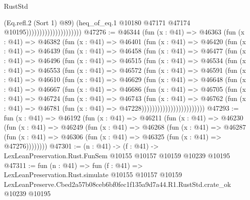 \begin{lexlean}{RustStd}
\begin{coremodule}
                                            (Eq.refl.{2} (Sort 1) @89)
                                            (heq_of_eq.{1}
                                              @10180
                                              @47171
                                              @47174
                                              @10195)))))))))))))))))))))
@47276 := @46344
    (fun (x : @41) =>
    @46363
      (fun (x : @41) =>
      @46382
        (fun (x : @41) =>
        @46401
          (fun (x : @41) =>
          @46420
            (fun (x : @41) =>
            @46439
              (fun (x : @41) =>
              @46458
                (fun (x : @41) =>
                @46477
                  (fun (x : @41) =>
                  @46496
                    (fun (x : @41) =>
                    @46515
                      (fun (x : @41) =>
                      @46534
                        (fun (x : @41) =>
                        @46553
                          (fun (x : @41) =>
                          @46572
                            (fun (x : @41) =>
                            @46591
                              (fun (x : @41) =>
                              @46610
                                (fun (x : @41) =>
                                @46629
                                  (fun (x : @41) =>
                                  @46648
                                    (fun (x : @41) =>
                                    @46667
                                      (fun (x : @41) =>
                                      @46686
                                        (fun (x : @41) =>
                                        @46705
                                          (fun (x : @41) =>
                                          @46724
                                            (fun (x : @41) =>
                                            @46743
                                              (fun (x : @41) =>
                                              @46762
                                                (fun (x : @41) =>
                                                @46781
                                                  (fun (x : @41) => @47228))))))))))))))))))))))))
@47293 := fun (x : @41) =>
  @46192
    (fun (x : @41) =>
    @46211
      (fun (x : @41) =>
      @46230
        (fun (x : @41) =>
        @46249
          (fun (x : @41) =>
          @46268
            (fun (x : @41) =>
            @46287
              (fun (x : @41) => @46306 (fun (x : @41) => @46325 (fun (x : @41) => @47276))))))))
@47301 := (n : @41) ->
  (f : @41) -> LexLeanPreservation.Rust.FunSem @10155 @10157 @10159 @10239 @10195
@47311 := fun (n : @41) =>
  fun (f : @41) =>
  LexLeanPreservation.Rust.simulate
    @10155
    @10157
    @10159
    LexLeanPreserve.Cbed2a57b08ceb6bf0fec1f135a9d7a44.R1.RustStd.crate_ok
    @10239
    @10195
\end{coremodule}
\end{lexlean}
